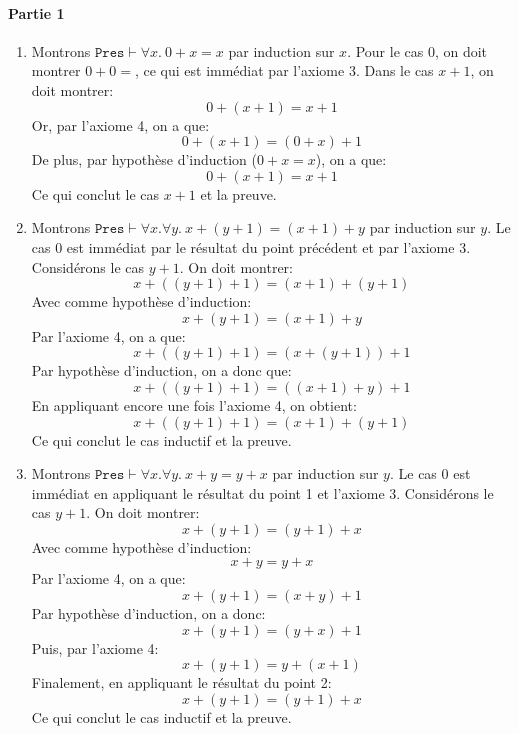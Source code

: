 \documentclass[12pt,french,a4paper]{article}
\begin{document}
\newpage

\begin{question}

\paragraph{Partie 1}

\begin{enumerate}
\item Montrons $\texttt{Pres} \vdash \forall x.\ 0 + x = x$ par induction sur $x$. Pour le cas $0$, on doit montrer $0 + 0 = $, ce qui est immédiat par l'axiome 3. Dans le cas $x + 1$, on doit montrer:
\[
0 + (x + 1) = x + 1
\]
Or, par l'axiome 4, on a que:
\[
0 + (x + 1) = (0 + x) + 1
\]
De plus, par hypothèse d'induction ($0 + x = x$), on a que:
\[
0 + (x + 1) = x + 1
\]
Ce qui conclut le cas $x + 1$ et la preuve.
\item Montrons $\texttt{Pres} \vdash \forall x. \forall y.\ x + (y + 1) = (x + 1) + y$ par induction sur $y$.
Le cas $0$ est immédiat par le résultat du point précédent et par l'axiome 3.
Considérons le cas $y + 1$. On doit montrer:
\[
x + ((y + 1) + 1) = (x + 1) + (y + 1)
\]
Avec comme hypothèse d'induction:
\[
x + (y + 1) = (x + 1) + y
\]
Par l'axiome 4, on a que:
\[
x + ((y + 1) + 1) = (x + (y + 1)) + 1
\]
Par hypothèse d'induction, on a donc que:
\[
x + ((y + 1) + 1) = ((x + 1) + y) + 1
\]
En appliquant encore une fois l'axiome 4, on obtient:
\[
x + ((y + 1) + 1) = (x + 1) + (y + 1)
\]
Ce qui conclut le cas inductif et la preuve.
\item Montrons $\texttt{Pres} \vdash \forall x. \forall y.\ x + y = y + x$ par induction sur $y$.
Le cas $0$ est immédiat en appliquant le résultat du point 1 et l'axiome 3.
Considérons le cas $y + 1$. On doit montrer:
\[
x + (y + 1) = (y + 1) + x
\]
Avec comme hypothèse d'induction:
\[
x + y = y + x
\]
Par l'axiome 4, on a que:
\[
x + (y + 1) = (x + y) + 1
\]
Par hypothèse d'induction, on a donc:
\[
x + (y + 1) = (y + x) + 1
\]
Puis, par l'axiome 4:
\[
x + (y + 1) = y + (x + 1)
\]
Finalement, en appliquant le résultat du point 2:
\[
x + (y + 1) = (y + 1) + x
\]
Ce qui conclut le cas inductif et la preuve.
\end{enumerate}

\end{question}
\end{document}
